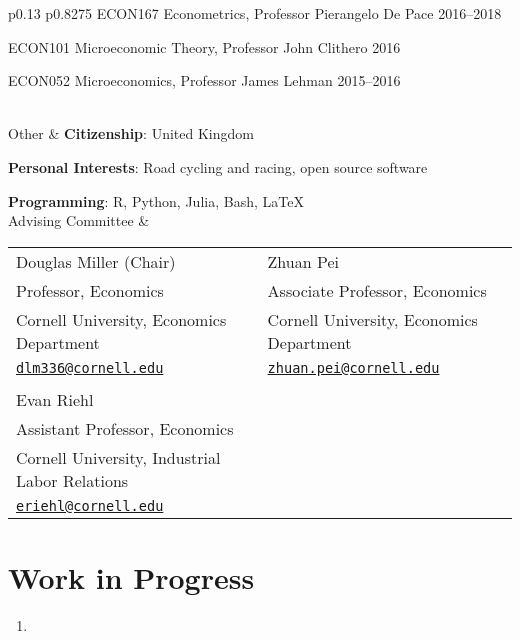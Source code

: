 \documentclass[letterpaper,11pt,oneside]{article}
\begin{document}
\begin{tabular}[\textwidth]{p{} p{}}
    ECON167 Econometrics, Professor Pierangelo De Pace \hfill 2016--2018

    ECON101 Microeconomic Theory, Professor John Clithero \hfill  2016

    ECON052 Microeconomics, Professor James Lehman \hfill 2015--2016

\\[15ex]
\Large{Other}
    & \textbf{Citizenship}: United Kingdom
    
    \textbf{Personal Interests}: Road cycling and racing, open source software
    
    \textbf{Programming}: R, Python, Julia, Bash, \LaTeX \vspace{0.2cm} \\

\Large{Advising Committee}
    & \begin{tabular}[t]{@{} l l}
        Douglas Miller (Chair)                         & Zhuan Pei                                \\
        Professor, Economics                           & Associate Professor, Economics           \\
        Cornell University, Economics Department       & Cornell University, Economics Department \\
        \href{mailto:dlm336@cornell.edu}{\nolinkurl{dlm336@cornell.edu}}
            & \href{mailto:zhuan.pei@cornell.edu}{\nolinkurl{zhuan.pei@cornell.edu}}            \\ \\
        Evan Riehl                                     \\
        Assistant Professor, Economics                 \\
        Cornell University, Industrial Labor Relations \\
        \href{mailto:eriehl@cornell.edu}{\nolinkurl{eriehl@cornell.edu}}
    \end{tabular}
\end{tabular}

\newpage
\onehalfspacing
\restoregeometry
{}

\section*{Work in Progress}
\begin{enumerate}[itemsep=2.5pt, label={}]
    \item {}
\end{enumerate}
\end{document}
